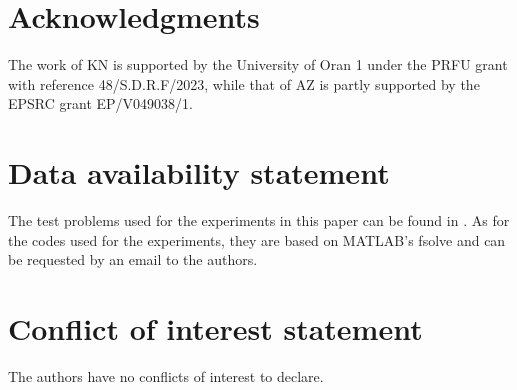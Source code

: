 




\section*{Acknowledgments}
The work of KN is supported by the University of Oran 1 under the PRFU grant with
reference 48/S.D.R.F/2023, while that of AZ is partly supported by the EPSRC grant EP/V049038/1.

\section*{Data availability statement}
The test problems used for the experiments in this paper can be found in \cite{Mitsos2006,WiesemannTsoukalasKleniatiRustem2013}. As for the codes used for
the experiments, they are based on MATLAB’s fsolve and can be requested by an email to the authors.

\section*{Conflict of interest statement}
The authors have no conflicts of interest to declare.


